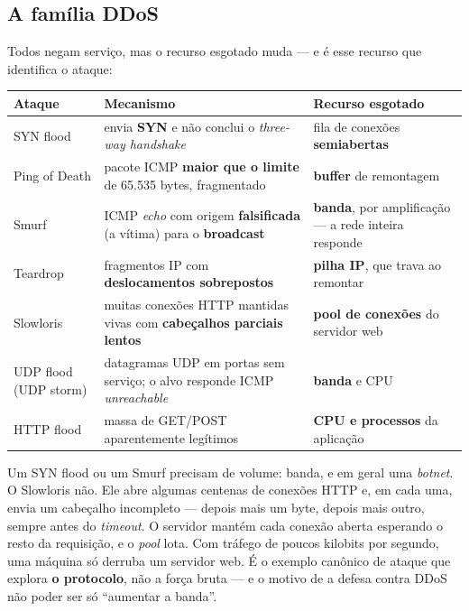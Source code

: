 \subsection{A família DDoS}

\begin{conceito}
Todos negam serviço, mas o recurso esgotado muda --- e é esse recurso que
identifica o ataque:

\begin{center}
\begin{tabular}{@{}p{2.5cm}p{4.2cm}p{4.6cm}@{}}
\toprule
\textbf{Ataque} & \textbf{Mecanismo} & \textbf{Recurso esgotado} \\
\midrule
SYN flood & envia \textbf{SYN} e não conclui o \textit{three-way
handshake} & fila de conexões \textbf{semiabertas} \\
\addlinespace
Ping of Death & pacote ICMP \textbf{maior que o limite} de 65.535 bytes,
fragmentado & \textbf{buffer} de remontagem \\
\addlinespace
Smurf & ICMP \textit{echo} com origem \textbf{falsificada} (a vítima) para
o \textbf{broadcast} & \textbf{banda}, por amplificação --- a rede inteira
responde \\
\addlinespace
Teardrop & fragmentos IP com \textbf{deslocamentos sobrepostos} &
\textbf{pilha IP}, que trava ao remontar \\
\addlinespace
Slowloris & muitas conexões HTTP mantidas vivas com \textbf{cabeçalhos
parciais lentos} & \textbf{pool de conexões} do servidor web \\
\addlinespace
UDP flood \newline (UDP storm) & datagramas UDP em portas sem serviço; o
alvo responde ICMP \textit{unreachable} & \textbf{banda} e CPU \\
\addlinespace
HTTP flood & massa de GET/POST aparentemente legítimos & \textbf{CPU e
processos} da aplicação \\
\bottomrule
\end{tabular}
\end{center}
\end{conceito}

\begin{exemplo}
Um SYN flood ou um Smurf precisam de volume: banda, e em geral uma
\textit{botnet}. O Slowloris não. Ele abre algumas centenas de conexões
HTTP e, em cada uma, envia um cabeçalho incompleto --- depois mais um byte,
depois mais outro, sempre antes do \textit{timeout}. O servidor mantém cada
conexão aberta esperando o resto da requisição, e o \textit{pool} lota. Com
tráfego de poucos kilobits por segundo, uma máquina só derruba um servidor
web. É o exemplo canônico de ataque que explora \textbf{o protocolo}, não a
força bruta --- e o motivo de a defesa contra DDoS não poder ser só
“aumentar a banda”.
\end{exemplo}

